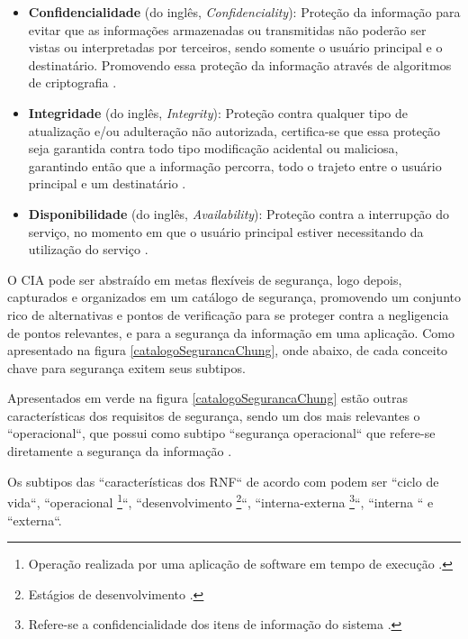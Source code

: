 \begin{itemize}
	\item \textbf{Confidencialidade} (do inglês, \textit{Confidenciality}): Proteção da informação para evitar que as informações armazenadas ou transmitidas não poderão ser vistas ou interpretadas por terceiros, sendo somente o usuário principal e o destinatário. Promovendo essa proteção da informação através de algoritmos de criptografia \cite{chung2012non} \cite{silva2007arquitetura}. 
	
	\item \textbf{Integridade} (do inglês, \textit{Integrity}): Proteção contra qualquer tipo de atualização e/ou adulteração não autorizada, certifica-se que essa proteção seja garantida contra todo tipo modificação acidental ou maliciosa, garantindo então que a informação percorra, todo o trajeto entre o usuário principal e um destinatário \cite{chung2012non} \cite{silva2007arquitetura}. 
	
	\item \textbf{Disponibilidade} (do inglês, \textit{Availability}): Proteção contra a interrupção do serviço, no momento em que o usuário principal estiver necessitando da utilização do serviço \cite{chung2012non} \cite{silva2007arquitetura}.
	  
\end{itemize}


O CIA pode ser abstraído em metas flexíveis de segurança, logo depois, capturados e organizados em um catálogo de segurança, promovendo um conjunto rico de alternativas e pontos de verificação para se proteger contra a negligencia de pontos relevantes, e para a segurança da informação em uma aplicação. Como apresentado na figura \ref{catalogoSegurancaChung}, onde abaixo, de cada conceito chave para segurança exitem seus subtipos. 

Apresentados em  verde na figura \ref{catalogoSegurancaChung} estão outras características dos requisitos de segurança, sendo um dos mais relevantes o ``operacional``, que possui como subtipo ``segurança operacional`` que refere-se diretamente a segurança da informação \cite{chung2012non}.

Os subtipos das ``características dos RNF`` de acordo com \cite{chung2012non} podem ser ``ciclo de vida``, ``operacional \footnote[1]{Operação realizada por uma aplicação de software em tempo de execução \cite{chung2012non}.}``, ``desenvolvimento \footnote[2]{Estágios de desenvolvimento \cite{chung2012non}.}``, ``interna-externa \footnote[3]{Refere-se a confidencialidade dos itens de informação do sistema \cite{chung2012non}.}``, ``interna `` e ``externa``.

